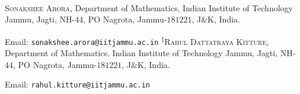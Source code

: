 \documentclass[11pt, a4paper]{article}
\numberwithin{equation}{section}
\theoremstyle{plain} %
\begin{document}
   
    
\vskip2mm\noindent 
\textsuperscript{\textdagger}\textsc{Sonakshee Arora}, Department of Mathematics, Indian Institute of Technology Jammu, Jagti, NH-$44$, PO Nagrota, Jammu-$181221$, J$\&$K,  India. 

\noindent Email: \texttt{\color{blue}sonakshee.arora@iitjammu.ac.in}
%
\vskip2mm\noindent 
\textsuperscript{$\ddagger$}\textsc{Rahul Dattatraya Kitture}, Department of Mathematics, Indian Institute of Technology Jammu, Jagti, NH-$44$, PO Nagrota, Jammu-$181221$, J$\&$K, India. 

\noindent Email: \texttt{\color{blue}rahul.kitture@iitjammu.ac.in}
\end{document}
